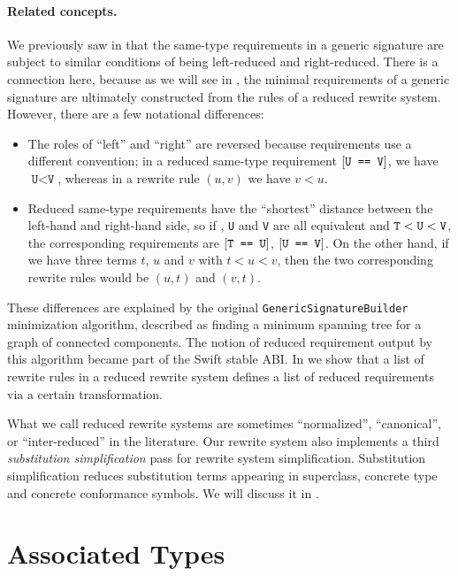 \documentclass[../generics]{subfiles}
\begin{document}
\paragraph{Related concepts.}
We previously saw in  that the same-type requirements in a generic signature are subject to similar conditions of being left-reduced and right-reduced. There is a connection here, because as we will see in , the minimal requirements of a generic signature are ultimately constructed from the rules of a reduced rewrite system. However, there are a few notational differences:
\begin{itemize}
\item The roles of ``left'' and ``right'' are reversed because requirements use a different convention; in a reduced same-type requirement $[\texttt{U == V}]$, we have $\texttt{U} < \texttt{V}$, whereas in a rewrite rule $(u, v)$ we have $v<u$.
\item Reduced same-type requirements have the ``shortest'' distance between the left-hand and right-hand side, so if \tT, \texttt{U} and \texttt{V} are all equivalent and $\texttt{T}<\texttt{U}<\texttt{V}$, the corresponding requirements are $[\texttt{T == U}]$, $[\texttt{U == V}]$. On the other hand, if we have three terms $t$, $u$ and $v$ with $t<u<v$, then the two corresponding rewrite rules would be $(u, t)$ and $(v, t)$.
\end{itemize}
These differences are explained by the original \texttt{GenericSignatureBuilder} minimization algorithm, described as finding a minimum spanning tree for a graph of connected components. The notion of reduced requirement output by this algorithm became part of the Swift stable ABI. In  we show that a list of rewrite rules in a reduced rewrite system defines a list of reduced requirements via a certain transformation.
 
What we call reduced rewrite systems are sometimes ``normalized'', ``canonical'', or ``inter-reduced'' in the literature. Our rewrite system also implements a third \emph{substitution simplification} pass for rewrite system simplification. Substitution simplification reduces substitution terms appearing in superclass, concrete type and concrete conformance symbols. We will discuss it in .

\section{Associated Types}\label{critical pairs}
\end{document}
